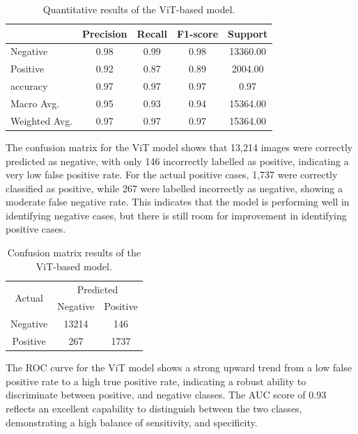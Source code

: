 \documentclass[../main]{subfiles}
\begin{document}
\begin{table}[h]
    \centering
    \begin{tabular}{|l|c|c|c|c|}
        \hline
         & Precision & Recall & F1-score & Support \\ \hline
        Negative & 0.98 & 0.99 & 0.98 & 13360.00 \\ \hline
        Positive & 0.92 & 0.87 & 0.89 & 2004.00 \\ \hline
        accuracy & 0.97 & 0.97 & 0.97 & 0.97 \\ \hline
        Macro Avg. & 0.95 & 0.93 & 0.94 & 15364.00 \\ \hline
        Weighted Avg. & 0.97 & 0.97 & 0.97 & 15364.00 \\ \hline
    \end{tabular}
    \caption{Quantitative results of the ViT-based model.}
    \label{tab:quantitative-results-vit}
\end{table}

\noindent The confusion matrix for the ViT model shows that 13,214 images were correctly predicted as negative, with only 146 incorrectly labelled as positive, indicating a very low false positive rate. For the actual positive cases, 1,737 were correctly classified as positive, while 267 were labelled incorrectly as negative, showing a moderate false negative rate. This indicates that the model is performing well in identifying negative cases, but there is still room for improvement in identifying positive cases.

\begin{table}[h]
    \centering
    \begin{tabular}{|c|c|c|}
        \hline
        \multirow{2}{*}{Actual} & \multicolumn{2}{c|}{Predicted} \\ \cline{2-3}
                                & Negative         & Positive         \\ \hline
        Negative                & 13214            & 146              \\ \hline
        Positive                & 267              & 1737              \\ \hline
    \end{tabular}
    \caption{Confusion matrix results of the ViT-based model.}
    \label{tab:confusion-matrix-vit}
\end{table}

\noindent The ROC curve for the ViT model shows a strong upward trend from a low false positive rate to a high true positive rate, indicating a robust ability to discriminate between positive, and negative classes. The AUC score of 0.93 reflects an excellent capability to distinguish between the two classes, demonstrating a high balance of sensitivity, and specificity.
\end{document}
